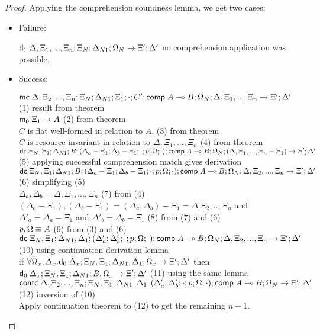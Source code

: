 \begin{proof}
   Applying the comprehension soundness lemma, we get two cases:
   
   \begin{itemize}
      \item Failure:
      
      $\mathsf{d}_1 \; \Delta, \Xi_1, ..., \Xi_n; \Xi_N; \Delta_{N1}; \Omega_N \rightarrow \Xi'; \Delta'$ \hfill no comprehension application was possible.
      
      \item Success:
      
      $\mathsf{mc} \; \Delta, \Xi_2, ..., \Xi_n; \Xi_N; \Delta_{N1}; \Xi_1; \cdot; C'; \mathsf{comp} \; A \multimap B; \Omega_N; \Delta, \Xi_1, ..., \Xi_n \rightarrow \Xi'; \Delta'$ \hfill (1) result from theorem \\
      $\mathsf{m}_0 \; \Xi_1 \rightarrow A$ \hfill (2) from theorem \\
      $C$ is flat well-formed in relation to $A$. \hfill (3) from theorem \\
      $C$ is resource invariant in relation to $\Delta, \Xi_1, ..., \Xi_n$ \hfill (4) from theorem \\
      
      $\mathsf{dc} \; \Xi_N, \Xi_1; \Delta_{N1}; B; (\Delta_a - \Xi_1; \Delta_b - \Xi_1; \cdot; p; \Omega; \cdot); \mathsf{comp} \; A \multimap B; \Omega_N; (\Delta, \Xi_1, ..., \Xi_n - \Xi_1) \rightarrow \Xi'; \Delta'$ \hfill (5) applying successful comprehension match gives derivation \\
      $\mathsf{dc} \; \Xi_N, \Xi_1; \Delta_{N1}; B; (\Delta_a - \Xi_1; \Delta_b - \Xi_1; \cdot; p; \Omega; \cdot); \mathsf{comp} \; A \multimap B; \Omega_N; \Delta, \Xi_2, ..., \Xi_n \rightarrow \Xi'; \Delta'$ \hfill (6) simplifying (5) \\
      $\Delta_a, \Delta_b = \Delta, \Xi_1, ..., \Xi_n$ \hfill (7) from (4) \\
      $(\Delta_a - \Xi_1), (\Delta_b - \Xi_1) = (\Delta_a, \Delta_b) - \Xi_1 = \Delta_, \Xi_2, .., \Xi_n$ and $\Delta'_a = \Delta_a - \Xi_1$ and $\Delta'_b = \Delta_b - \Xi_1$ \hfill (8) from (7) and (6) \\
      $p, \Omega \equiv A$ \hfill (9) from (3) and (6) \\
      $\mathsf{dc} \; \Xi_N, \Xi_1; \Delta_{N1}, \Delta_1; (\Delta'_a; \Delta'_b; \cdot; p; \Omega; \cdot); \mathsf{comp} \; A \multimap B; \Omega_N; \Delta, \Xi_2, ..., \Xi_n \rightarrow \Xi'; \Delta'$ \hfill (10) using continuation derivation lemma \\
      if $\forall \Omega_x, \Delta_x. \mathsf{d}_0 \; \Delta_x; \Xi_N, \Xi_1; \Delta_{N1}, \Delta_1; \Omega_x \rightarrow \Xi'; \Delta'$ then $\mathsf{d}_0 \; \Delta_x; \Xi_N, \Xi_1; \Delta_{N1}; B, \Omega_x \rightarrow \Xi'; \Delta'$ \hfill (11) using the same lemma \\ 
      $\mathsf{contc} \; \Delta, \Xi_2, ..., \Xi_n; \Xi_N, \Xi_1; \Delta_{N1}, \Delta_1; (\Delta'_a; \Delta'_b; \cdot; p; \Omega; \cdot); \mathsf{comp} \; A \multimap B; \Omega_N \rightarrow \Xi'; \Delta'$ \hfill (12) inversion of (10) \\
      Apply continuation theorem to (12) to get the remaining $n-1$.
   \end{itemize}
\end{proof}

